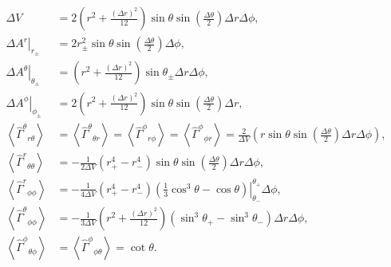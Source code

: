 \begin{align}
    \Delta V &= 2 \left(r^2 + \frac{\left(\Delta r\right)^2}{12} \right) \sin\theta \sin{\left(\frac{\Delta\theta}{2}\right)}\Delta r \Delta \phi, \\
    \left. \Delta A^r \right|_{r_\pm} &= 2 r_\pm^2 \sin\theta \sin{\left(\frac{\Delta\theta}{2}\right)} \Delta \phi, \\
    \left. \Delta A^\theta \right|_{\theta_\pm} &= \left(r^2 + \frac{\left(\Delta r\right)^2}{12} \right) \sin\theta_\pm \Delta r \Delta \phi, \\
    \left. \Delta A^\phi \right|_{\phi_\pm} &= 2 \left(r^2 + \frac{\left(\Delta r\right)^2}{12} \right) \sin\theta \sin{\left(\frac{\Delta\theta}{2}\right)} \Delta r, \\
    \left\langle \hat{\Gamma}^\theta{}_{r\theta} \right\rangle &= 
    \left\langle \hat{\Gamma}^\theta{}_{\theta r} \right\rangle = 
    \left\langle \hat{\Gamma}^\phi{}_{r\phi} \right\rangle = 
    \left\langle \hat{\Gamma}^\phi{}_{\phi r} \right\rangle = \frac{2}{\Delta V} \left( r \sin\theta \sin{\left(\frac{\Delta\theta}{2}\right)} \Delta r \Delta \phi \right), \\
    \left\langle \hat{\Gamma}^r{}_{\theta\theta} \right\rangle &= - \frac{1}{2 \Delta V}\left(r_+^4 - r_-^4 \right) \sin\theta \sin{\left(\frac{\Delta\theta}{2}\right)} \Delta r \Delta \phi, \\
    \left\langle \hat{\Gamma}^r{}_{\phi\phi} \right\rangle &= - \frac{1}{4 \Delta V}\left(r_+^4 - r_-^4 \right) 
            \left.\left(\frac{1}{3}\cos^3\theta - \cos\theta \right)\right|^{\theta_+}_{\theta_-} \Delta \phi, \\
    \left\langle \hat{\Gamma}^\theta{}_{\phi\phi} \right\rangle &= -\frac{1}{3\Delta V}\left(r^2 + \frac{\left(\Delta r\right)^2}{12} \right)
            \left( \sin^3\theta_+ - \sin^3\theta_- \right) \Delta r \Delta \phi, \\
    \left\langle \hat{\Gamma}^\phi{}_{\theta\phi} \right\rangle &= 
    \left\langle \hat{\Gamma}^\phi{}_{\phi\theta} \right\rangle = \cot\theta.
\end{align}

